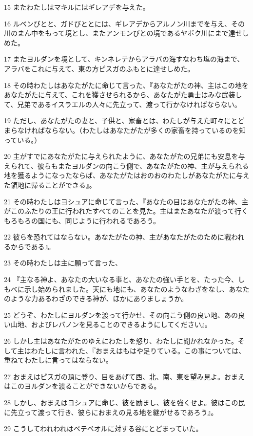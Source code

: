 \par 15 またわたしはマキルにはギレアデを与えた。
\par 16 ルベンびとと、ガドびととには、ギレアデからアルノン川までを与え、その川のまん中をもって境とし、またアンモンびとの境であるヤボク川にまで達せしめた。
\par 17 またヨルダンを境として、キンネレテからアラバの海すなわち塩の海まで、アラバをこれに与えて、東の方ピスガのふもとに達せしめた。
\par 18 その時わたしはあなたがたに命じて言った、『あなたがたの神、主はこの地をあなたがたに与えて、これを獲させられるから、あなたがた勇士はみな武装して、兄弟であるイスラエルの人々に先立って、渡って行かなければならない。
\par 19 ただし、あなたがたの妻と、子供と、家畜とは、わたしが与えた町々にとどまらなければならない。（わたしはあなたがたが多くの家畜を持っているのを知っている。）
\par 20 主がすでにあなたがたに与えられたように、あなたがたの兄弟にも安息を与えられて、彼らもまたヨルダンの向こう側で、あなたがたの神、主が与えられる地を獲るようになったならば、あなたがたはおのおのわたしがあなたがたに与えた領地に帰ることができる』。
\par 21 その時わたしはヨシュアに命じて言った、『あなたの目はあなたがたの神、主がこのふたりの王に行われたすべてのことを見た。主はまたあなたが渡って行くもろもろの国にも、同じように行われるであろう。
\par 22 彼らを恐れてはならない。あなたがたの神、主があなたがたのために戦われるからである』。
\par 23 その時わたしは主に願って言った、
\par 24 『主なる神よ、あなたの大いなる事と、あなたの強い手とを、たった今、しもべに示し始められました。天にも地にも、あなたのようなわざをなし、あなたのような力あるわざのできる神が、ほかにありましょうか。
\par 25 どうぞ、わたしにヨルダンを渡って行かせ、その向こう側の良い地、あの良い山地、およびレバノンを見ることのできるようにしてください』。
\par 26 しかし主はあなたがたのゆえにわたしを怒り、わたしに聞かれなかった。そして主はわたしに言われた、『おまえはもはや足りている。この事については、重ねてわたしに言ってはならない。
\par 27 おまえはピスガの頂に登り、目をあげて西、北、南、東を望み見よ。おまえはこのヨルダンを渡ることができないからである。
\par 28 しかし、おまえはヨシュアに命じ、彼を励まし、彼を強くせよ。彼はこの民に先立って渡って行き、彼らにおまえの見る地を継がせるであろう』。
\par 29 こうしてわれわれはベテペオルに対する谷にとどまっていた。

